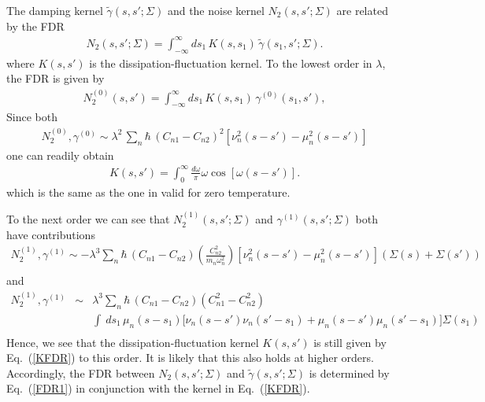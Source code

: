 \documentclass[%
amssymb,preprint,preprintnumbers,nofootinbib,superscriptaddress]{revtex4}
\begin{document}
The damping kernel $\tilde{\gamma}(s,s';\Sigma)$ and the noise kernel $N_{2}(s,s';\Sigma)$ are related by the FDR
\begin{eqnarray}\label{FDR1}
N_{2}(s,s';\Sigma)=\int_{-\infty}^{\infty}ds_{1}\, K(s,s_{1})\,\tilde{\gamma}(s_{1},s';\Sigma).
\end{eqnarray}
where $K(s,s')$ is the dissipation-fluctuation kernel.
To the lowest order in $\lambda$, the FDR is given by
\begin{eqnarray}
N_{2}^{(0)}(s,s')=\int_{-\infty}^{\infty}ds_{1}\, K(s,s_{1})\,\gamma^{(0)}(s_{1},s'),
\end{eqnarray}
Since both 
\begin{eqnarray}
    N_{2}^{(0)},\gamma^{(0)}\sim\lambda^{2}\,\sum_{n}\hbar\,(C_{n1}-C_{n2})^{2}\left[\nu_{n}^{2}(s-s')-\mu_{n}^{2}(s-s')\right]
\end{eqnarray}
one can readily obtain
\begin{eqnarray}\label{KFDR}
K(s,s')=\int_{0}^{\infty}\frac{d\omega}{\pi}\omega\cos[\omega(s-s')].
\end{eqnarray}
which is the same as the one in \cite{HPZ93} valid for zero temperature.

To the next order we can see that $N_{2}^{(1)}(s,s';\Sigma)$ and $\gamma^{(1)}(s,s';\Sigma)$ both have contributions
\begin{eqnarray}
    N_{2}^{(1)},\gamma^{(1)}\sim -\lambda^{3}\sum_{n}\hbar\,(C_{n1}-C_{n2})\left(\frac{C_{n2}^{2}}{m_{n}\omega_{n}^{2}}\right)
\left[\nu_{n}^{2}(s-s')-\mu_{n}^{2}(s-s')\right]\left(\Sigma(s)+\Sigma(s')\right)\nonumber\\
\end{eqnarray}
and 
\begin{eqnarray}
    N_{2}^{(1)},\gamma^{(1)}&\sim& \lambda^{3}\sum_{n}\hbar\,(C_{n1}-C_{n2})(C_{n1}^{2}-C_{n2}^{2})\nonumber\\
    &&\int\ ds_{1}\,\mu_{n}(s-s_{1})
\Big[\nu_{n}(s-s')\nu_{n}(s'-s_{1})+\mu_{n}(s-s')\mu_{n}(s'-s_{1})\Big]\Sigma(s_{1})\nonumber\\
\end{eqnarray}
Hence, we see that the dissipation-fluctuation kernel $K(s,s')$ is still given by Eq.~(\ref{KFDR}) to this order. It is likely that this also holds at higher orders. Accordingly, the FDR between $N_{2}(s,s';\Sigma)$ and $\tilde{\gamma}(s,s';\Sigma)$ is determined by Eq.~(\ref{FDR1}) in conjunction with the kernel in Eq.~(\ref{KFDR}).
\end{document}
